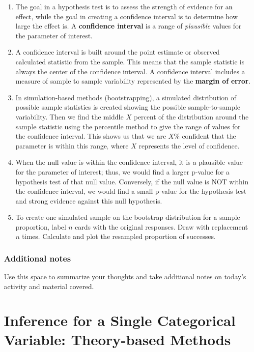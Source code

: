 \documentclass[
]{report}
\begin{document}
\begin{enumerate}
\def\labelenumi{\arabic{enumi}.}
\item
  The goal in a hypothesis test is to assess the strength of evidence for an effect, while the goal in creating a confidence interval is to determine how large the effect is. A \textbf{confidence interval} is a range of \emph{plausible} values for the parameter of interest.
\item
  A confidence interval is built around the point estimate or observed calculated statistic from the sample. This means that the sample statistic is always the center of the confidence interval. A confidence interval includes a measure of sample to sample variability represented by the \textbf{margin of error}.
\item
  In simulation-based methods (bootstrapping), a simulated distribution of possible sample statistics is created showing the possible sample-to-sample variability. Then we find the middle \(X\) percent of the distribution around the sample statistic using the percentile method to give the range of values for the confidence interval. This shows us that we are \(X\)\% confident that the parameter is within this range, where \(X\) represents the level of confidence.
\item
  When the null value is within the confidence interval, it is a plausible value for the parameter of interest; thus, we would find a larger p-value for a hypothesis test of that null value. Conversely, if the null value is NOT within the confidence interval, we would find a small p-value for the hypothesis test and strong evidence against this null hypothesis.
\item
  To create one simulated sample on the bootstrap distribution for a sample proportion, label \(n\) cards with the original responses. Draw with replacement \(n\) times. Calculate and plot the resampled proportion of successes.
\end{enumerate}

\subsection{Additional notes}\label{additional-notes-7}

Use this space to summarize your thoughts and take additional notes on today's activity and material covered.

\newpage

\chapter{Inference for a Single Categorical Variable: Theory-based Methods}\label{inference-for-a-single-categorical-variable-theory-based-methods}
\end{document}
